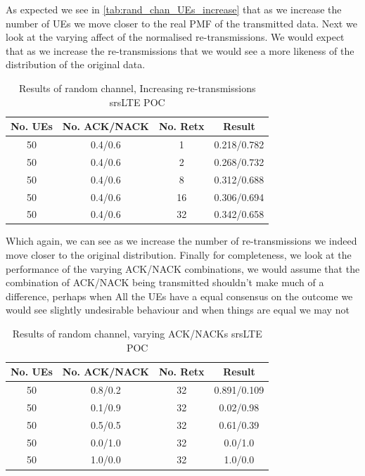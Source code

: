 \documentclass{article}
\begin{document}
As expected we see in \cref{tab:rand_chan_UEs_increase} that as we increase the number of UEs we move closer to the real \ac{PMF} of the transmitted data. 
Next we look at the varying affect of the normalised re-transmissions. We would expect that as we increase the re-transmissions that we would see a more likeness of the distribution of the original data.

\begin{table}[H]
    \centering
 \begin{tabular}{||c c c c||} 
 \hline
 No. UEs & No. ACK/NACK & No. Retx & Result \\ [0.5ex] 
 \hline\hline
 50 &  0.4/0.6 & 1 &  0.218/0.782  \\ 
 \hline
 50 &  0.4/0.6 & 2 & 0.268/0.732 \\
 \hline
 50 &  0.4/0.6 & 8 & 0.312/0.688 \\
 \hline
 50 &  0.4/0.6 & 16 & 0.306/0.694 \\
 \hline
 50 &  0.4/0.6 & 32 & 0.342/0.658 \\ [1ex] 
 \hline
\end{tabular}
    \caption{Results of random channel, Increasing re-transmissions srsLTE POC}
    \label{tab:rand_chan_rtx_increase}
\end{table}

Which again, we can see as we increase the number of re-transmissions we indeed move closer to the original distribution. Finally for completeness, we look at the performance of the varying ACK/NACK combinations, we would assume that the combination of ACK/NACK being transmitted shouldn't make much of a difference, perhaps when All the UEs have a equal consensus on the outcome we would see slightly undesirable behaviour and when things are equal we may not 

\begin{table}[H]
    \centering
 \begin{tabular}{||c c c c||} 
 \hline
 No. UEs & No. ACK/NACK & No. Retx & Result \\ [0.5ex] 
 \hline\hline
 50 & 0.8/0.2 & 32 &  0.891/0.109 \\ 
 \hline
 50 & 0.1/0.9 & 32 & 0.02/0.98 \\
 \hline
 50 & 0.5/0.5 & 32 & 0.61/0.39 \\
 \hline
 \hline
 50 & 0.0/1.0 & 32 & 0.0/1.0 \\
 \hline
 50 & 1.0/0.0 & 32 & 1.0/0.0 \\ [1ex] 
 \hline
\end{tabular}
    \caption{Results of random channel, varying ACK/NACKs srsLTE POC}
    \label{tab:rand_chan_acks_change}
\end{table}
\end{document}
